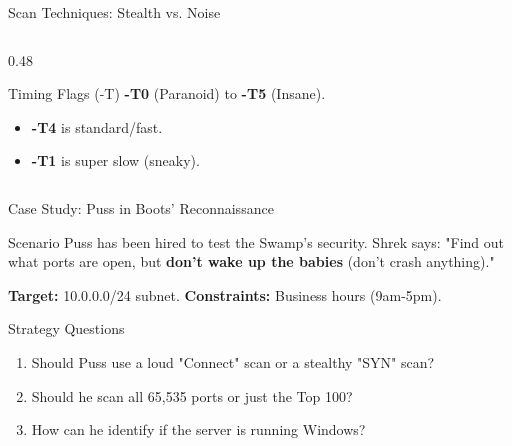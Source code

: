 \documentclass[aspectratio=169]{beamer}  %
\begin{document}
\begin{frame}{Scan Techniques: Stealth vs. Noise}
\begin{columns}[T]
\begin{column}{0.48\textwidth}
\begin{center}
            \end{center}
            \begin{exampleblock}{Timing Flags (-T)}
                \footnotesize
                \textbf{-T0} (Paranoid) to \textbf{-T5} (Insane).
                \begin{itemize}
                    \item \textbf{-T4} is standard/fast.
                    \item \textbf{-T1} is super slow (sneaky).
                \end{itemize}
            \end{exampleblock}
        \end{column}
    \end{columns}
\end{frame}

\begin{frame}{Case Study: Puss in Boots' Reconnaissance}
    \begin{alertblock}{Scenario}
        \footnotesize
        Puss has been hired to test the Swamp's security. Shrek says: "Find out what ports are open, but \textbf{don't wake up the babies} (don't crash anything)."
        
        \vspace{0.2em}
        \textbf{Target:} 10.0.0.0/24 subnet.
        \textbf{Constraints:} Business hours (9am-5pm).
    \end{alertblock}
    \begin{block}{Strategy Questions}
        \footnotesize
        \begin{enumerate}
            \item Should Puss use a loud "Connect" scan or a stealthy "SYN" scan?
            \item Should he scan all 65,535 ports or just the Top 100?
            \item How can he identify if the server is running Windows?
        \end{enumerate}
    \end{block}
\end{frame}
\end{document}
